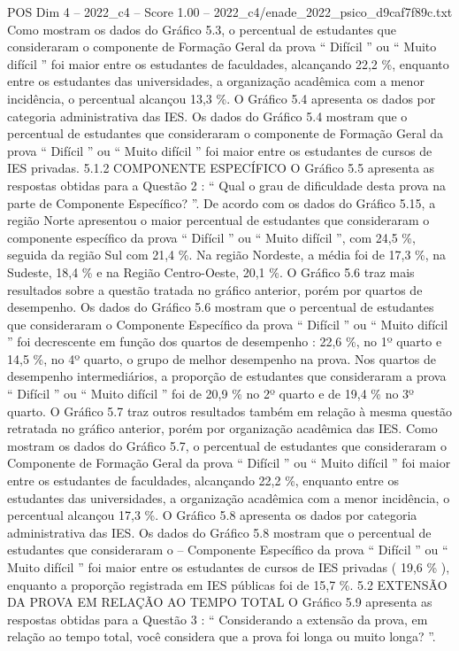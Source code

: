 \begin{textsample}{POS Dim 4 – 2022\_c4 – Score 1.00 – 2022\_c4/enade\_2022\_psico\_d9caf7f89c.txt}
Como mostram os dados do Gráfico 5.3, o percentual de estudantes que consideraram o componente de Formação Geral da prova “ Difícil ” ou “ Muito difícil ” foi maior entre os estudantes de faculdades, alcançando 22,2 \%, enquanto entre os estudantes das universidades, a organização acadêmica com a menor incidência, o percentual alcançou 13,3 \%.
O Gráfico 5.4 apresenta os dados por categoria administrativa das IES.
Os dados do Gráfico 5.4 mostram que o percentual de estudantes que consideraram o componente de Formação Geral da prova “ Difícil ” ou “ Muito difícil ” foi maior entre os estudantes de cursos de IES privadas. 5.1.2 COMPONENTE ESPECÍFICO O Gráfico 5.5 apresenta as respostas obtidas para a Questão 2 : “ Qual o grau de dificuldade desta prova na parte de Componente Específico? ”.
De acordo com os dados do Gráfico 5.15, a região Norte apresentou o maior percentual de estudantes que consideraram o componente específico da prova “ Difícil ” ou “ Muito difícil ”, com 24,5 \%, seguida da região Sul com 21,4 \%.
Na região Nordeste, a média foi de 17,3 \%, na Sudeste, 18,4 \% e na Região Centro-Oeste, 20,1 \%.
O Gráfico 5.6 traz mais resultados sobre a questão tratada no gráfico anterior, porém por quartos de desempenho.
Os dados do Gráfico 5.6 mostram que o percentual de estudantes que consideraram o Componente Específico da prova “ Difícil ” ou “ Muito difícil ” foi decrescente em função dos quartos de desempenho : 22,6 \%, no 1º quarto e 14,5 \%, no 4º quarto, o grupo de melhor desempenho na prova.
Nos quartos de desempenho intermediários, a proporção de estudantes que consideraram a prova “ Difícil ” ou “ Muito difícil ” foi de 20,9 \% no 2º quarto e de 19,4 \% no 3º quarto.
O Gráfico 5.7 traz outros resultados também em relação à mesma questão retratada no gráfico anterior, porém por organização acadêmica das IES.
Como mostram os dados do Gráfico 5.7, o percentual de estudantes que consideraram o Componente de Formação Geral da prova “ Difícil ” ou “ Muito difícil ” foi maior entre os estudantes de faculdades, alcançando 22,2 \%, enquanto entre os estudantes das universidades, a organização acadêmica com a menor incidência, o percentual alcançou 17,3 \%.
O Gráfico 5.8 apresenta os dados por categoria administrativa das IES.
Os dados do Gráfico 5.8 mostram que o percentual de estudantes que consideraram o – Componente Específico da prova “ Difícil ” ou “ Muito difícil ” foi maior entre os estudantes de cursos de IES privadas ( 19,6 \% ), enquanto a proporção registrada em IES públicas foi de 15,7 \%. 5.2 EXTENSÃO DA PROVA EM RELAÇÃO AO TEMPO TOTAL O Gráfico 5.9 apresenta as respostas obtidas para a Questão 3 : “ Considerando a extensão da prova, em relação ao tempo total, você considera que a prova foi longa ou muito longa? ”.

\end{textsample}

